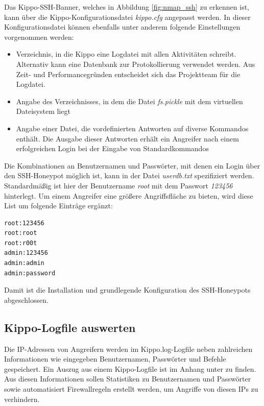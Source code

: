 Das Kippo-SSH-Banner, welches in Abbildung \ref{fig:nmap_ssh} zu erkennen ist, kann über die Kippo-Konfigurationsdatei \textit{kippo.cfg} angepasst werden. In dieser Konfigurationsdatei können ebenfalls unter anderem folgende Einstellungen vorgenommen werden:

\begin{itemize}
\item Verzeichnis, in die Kippo eine Logdatei mit allen Aktivitäten schreibt. Alternativ kann eine Datenbank zur Protokollierung verwendet werden. Aus Zeit- und Performancegründen entscheidet sich das Projektteam für die Logdatei.
\item Angabe des Verzeichnisses, in dem die Datei \textit{fs.pickle} mit dem virtuellen Dateisystem liegt
\item Angabe einer Datei, die vordefinierten Antworten auf diverse Kommandos enthält. Die Ausgabe dieser Antworten erhält ein Angreifer nach einem erfolgreichen Login bei der Eingabe von Standardkommandos
\end{itemize}

Die Kombinationen an Benutzernamen und Passwörter, mit denen ein Login über den SSH-Honeypot möglich ist, kann in der Datei \textit{userdb.txt} spezifiziert werden. Standardmäßig ist hier der Benutzername \textit{root} mit dem Passwort \textit{123456} hinterlegt. Um einem Angreifer eine größere Angriffsfläche zu bieten, wird diese List um folgende Einträge ergänzt:

\begin{lstlisting}[style=customc]
root:123456
root:root
root:r00t
admin:123456
admin:admin
admin:password
\end{lstlisting}

Damit ist die Installation und grundlegende Konfiguration des SSH-Honeypots abgeschlossen.

\subsection{Kippo-Logfile auswerten}
\label{subsec:Kippo-Logfile auswerten}


Die IP-Adressen von Angreifern werden im Kippo.log-Logfile neben zahlreichen Informationen wie eingegeben Benutzernamen, Passwörter und Befehle gespeichert. Ein Auszug aus einem Kippo-Logfile ist im Anhang unter \textit{} zu finden. Aus diesen Informationen sollen Statistiken zu Benutzernamen und Passwörter sowie automatisiert Firewallregeln erstellt werden, um Angriffe von diesen IPs zu verhindern.

